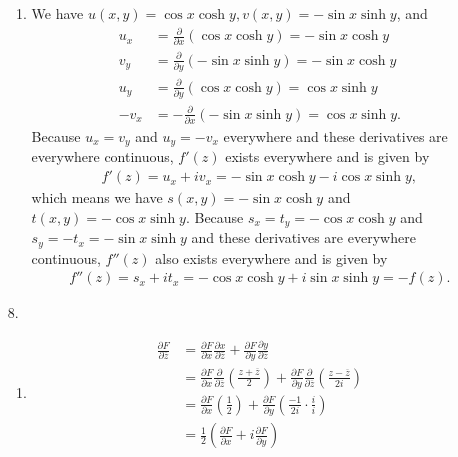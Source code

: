 \documentclass[a4paper,12pt]{article}
\begin{document}
\begin{enumerate}
\begin{enumerate}
            \item
                We have $u(x, y) = \cos x \cosh y, v(x, y) = -\sin x \sinh y$, and
                \begin{align*}
                    u_x &= \frac{\partial}{\partial x}(\cos x \cosh y) = -\sin x \cosh y \\
                    v_y &= \frac{\partial}{\partial y}(-\sin x \sinh y) = -\sin x \cosh y \\
                    u_y &= \frac{\partial}{\partial y}(\cos x \cosh y) = \cos x \sinh y \\
                    -v_x &= -\frac{\partial}{\partial x}(-\sin x \sinh y) = \cos x \sinh y.
                \end{align*}
                Because $u_x = v_y$ and $u_y = -v_x$ everywhere and these derivatives are everywhere continuous, $f'(z)$ exists everywhere and is given by
                \begin{align*}
                    f'(z) = u_x + iv_x = -\sin x \cosh y - i \cos x \sinh y,
                \end{align*}
                which means we have $s(x, y) = -\sin x \cosh y$ and $t(x, y) = -\cos x \sinh y$. Because $s_x = t_y = -\cos x \cosh y$ and $s_y = -t_x = -\sin x \sinh y$ and these derivatives are everywhere continuous, $f''(z)$ also exists everywhere and is given by
                \begin{align*}
                    f''(z) = s_x + it_x = -\cos x \cosh y + i \sin x \sinh y = -f(z).
                \end{align*}
        \end{enumerate}

    \item[8.]
        \begin{enumerate}
            \item
                \begin{align*}
                    \frac{\partial F}{\partial \overline{z}} &= \frac{\partial F}{\partial x} \frac{\partial x}{\partial \overline{z}} + \frac{\partial F}{\partial y} \frac{\partial y}{\partial \overline{z}} \\
                    &= \frac{\partial F}{\partial x} \frac{\partial}{\partial \overline{z}} \left( \frac{z + \overline{z}}{2} \right) + \frac{\partial F}{\partial y} \frac{\partial}{\partial \overline{z}} \left( \frac{z - \overline{z}}{2i} \right) \\
                    &= \frac{\partial F}{\partial x} \left( \frac{1}{2} \right) + \frac{\partial F}{\partial y} \left( \frac{-1}{2i} \cdot \frac{i}{i} \right) \\
                    &= \frac{1}{2} \left( \frac{\partial F}{\partial x} + i \frac{\partial F}{\partial y} \right)
                \end{align*}


\end{enumerate}
\end{enumerate}
\end{document}

